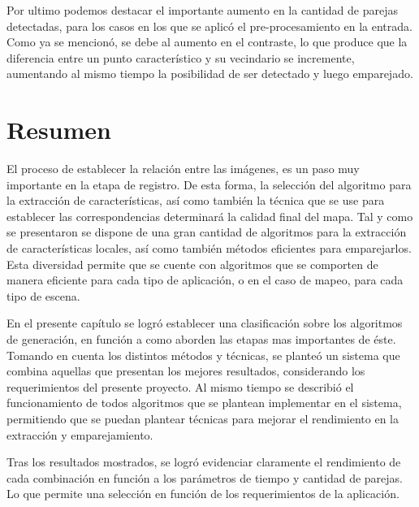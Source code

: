 Por ultimo podemos destacar el importante aumento en la cantidad de parejas detectadas, para los casos en los que se aplicó el pre-procesamiento en la entrada. Como ya se mencionó, se debe al aumento en el contraste, lo que produce que la diferencia entre un punto característico y su vecindario se incremente, aumentando al mismo tiempo la posibilidad de ser detectado y luego emparejado.


\section{Resumen}

El proceso de establecer la relación entre las imágenes, es un paso muy importante en la etapa de registro. De esta forma, la selección del algoritmo para la extracción de características, así como también la técnica que se use para establecer las correspondencias determinará la calidad final del mapa. Tal y como se presentaron se dispone de una gran cantidad de algoritmos para la extracción de características locales, así como también métodos eficientes para emparejarlos. Esta diversidad permite que se cuente con algoritmos que se comporten de manera eficiente para cada tipo de aplicación, o en el caso de mapeo, para cada tipo de escena. 

En el presente capítulo se logró establecer una clasificación sobre los algoritmos de generación, en función a como aborden las etapas mas importantes de éste. Tomando en cuenta los distintos métodos y técnicas, se planteó un sistema que combina aquellas que presentan los mejores resultados, considerando los requerimientos del presente proyecto. Al mismo tiempo se describió el funcionamiento de todos algoritmos que se plantean implementar en el sistema, permitiendo que se puedan plantear técnicas para mejorar el rendimiento en la extracción y emparejamiento. 

Tras los resultados mostrados, se logró evidenciar claramente el rendimiento de cada combinación en función a los parámetros de tiempo y cantidad de parejas. Lo que permite una selección en función de los requerimientos de la aplicación. 